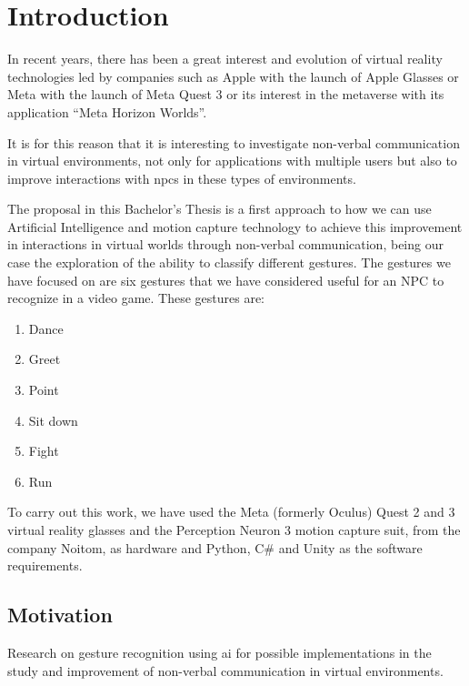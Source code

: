 \chapter*{Introduction}
\label{cap:introduction}


In recent years, there has been a great interest and evolution of virtual reality technologies led by companies such as Apple with the launch of Apple Glasses or Meta with the launch of Meta Quest 3 or its interest in the \gls{metaverse} with its application ``Meta Horizon Worlds''.


It is for this reason that it is interesting to investigate non-verbal communication in virtual environments, not only for applications with multiple users but also to improve interactions with \glspl{npc} in these types of environments.


The proposal in this Bachelor's Thesis is a first approach to how we can use Artificial Intelligence and motion capture technology to achieve this improvement in interactions in virtual worlds through non-verbal communication, being our case the exploration of the ability to classify different gestures.
The gestures we have focused on are six gestures that we have considered useful for an NPC to recognize in a video game. These gestures are:
\begin{enumerate}
	\item Dance
	\item Greet
	\item Point
	\item Sit down
	\item Fight
	\item Run
\end{enumerate}

To carry out this work, we have used the Meta (formerly Oculus) Quest 2 and 3 virtual reality glasses and the Perception Neuron 3 motion capture suit, from the company Noitom, as hardware and Python, C\# and Unity as the software requirements.
\section{Motivation}
Research on gesture recognition using \gls{ai} for possible implementations in the study and improvement of non-verbal communication in virtual environments.

